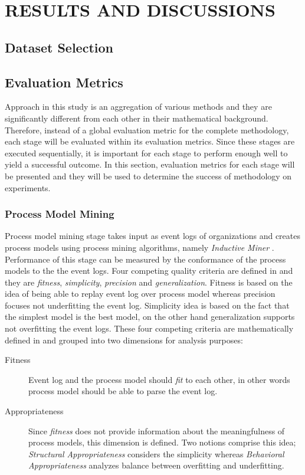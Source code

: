 \chapter{RESULTS AND DISCUSSIONS}
\label{chp:results-and-discussions}
 

\section{Dataset Selection}
\label{sec:dataset-selection}
 

\section{Evaluation Metrics}
\label{sec:evaluation-metrics}
Approach in this study is an aggregation of various methods and they are significantly different from each other in their mathematical background. Therefore, instead of a global evaluation metric for the complete methodology, each stage will be evaluated within its evaluation metrics. Since these stages are executed sequentially, it is important for each stage to perform enough well to yield a successful outcome. In this section, evaluation metrics for each stage will be presented and they will be used to determine the success of methodology on experiments.

\subsection{Process Model Mining}
\label{subsec:process-model-mining-eval}
Process model mining stage takes input as event logs of organizations and creates process models using process mining algorithms, namely \textit{Inductive Miner} \cite{leemans2014discoveringinfrequent}. Performance of this stage can be measured by the conformance of the process models to the the event logs. Four competing quality criteria are defined in \cite{van2011process} and they are \textit{fitness}, \textit{simplicity}, \textit{precision} and \textit{generalization}. Fitness is based on the idea of being able to replay event log over process model whereas precision focuses not underfitting the event log. Simplicity idea is based on the fact that the simplest model is the best model, on the other hand generalization supports not overfitting the event logs. These four competing criteria are mathematically defined in \cite{rozinat2008conformance} and grouped into two dimensions for analysis purposes:

\begin{description}
  \item[Fitness] Event log and the process model should \textit{fit} to each other, in other words process model should be able to parse the event log. 
  \item[Appropriateness] Since \textit{fitness} does not provide information about the meaningfulness of process models, this dimension is defined. Two notions comprise this idea; \textit{Structural Appropriateness} considers the simplicity whereas \textit{Behavioral Appropriateness} analyzes balance between overfitting and underfitting.
\end{description}

